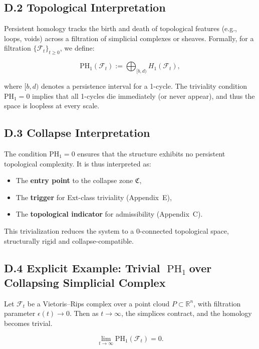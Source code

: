 \documentclass[11pt]{article}
\DeclareMathOperator{\PH}{PH}
\begin{document}
\subsection*{D.2 Topological Interpretation}

Persistent homology tracks the birth and death of topological features (e.g., loops, voids) across a filtration of simplicial complexes or sheaves. Formally, for a filtration \( \{ \mathcal{F}_t \}_{t \geq 0} \), we define:

\[
\mathrm{PH}_1(\mathcal{F}_t) := \bigoplus_{[b,d)} H_1(\mathcal{F}_t),
\]

where \([b,d)\) denotes a persistence interval for a 1-cycle. The triviality condition \( \mathrm{PH}_1 = 0 \) implies that all 1-cycles die immediately (or never appear), and thus the space is loopless at every scale.

\subsection*{D.3 Collapse Interpretation}

The condition \( \mathrm{PH}_1 = 0 \) ensures that the structure exhibits no persistent topological complexity. It is thus interpreted as:

\begin{itemize}
  \item The \textbf{entry point} to the collapse zone \( \mathfrak{C} \),
  \item The \textbf{trigger} for Ext-class triviality (Appendix~E),
  \item The \textbf{topological indicator} for admissibility (Appendix~C).
\end{itemize}

This trivialization reduces the system to a 0-connected topological space, structurally rigid and collapse-compatible.

\subsection*{D.4 Explicit Example: Trivial \(\PH_1\)over Collapsing Simplicial Complex}

Let \( \mathcal{F}_t \) be a Vietoris–Rips complex over a point cloud \( P \subset \mathbb{R}^n \), with filtration parameter \( \epsilon(t) \to 0 \). Then as \( t \to \infty \), the simplices contract, and the homology becomes trivial.

\[
\lim_{t \to \infty} \mathrm{PH}_1(\mathcal{F}_t) = 0.
\]
\end{document}
